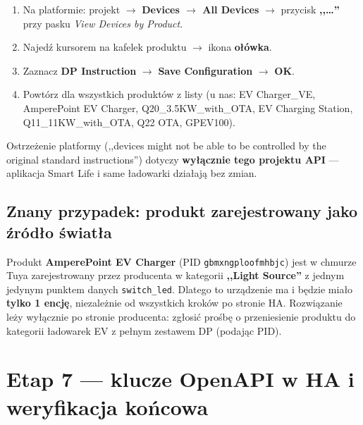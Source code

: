 \documentclass[11pt,a4paper]{article}
\begin{document}
\begin{enumerate}
\item Na platformie: projekt $\to$ \textbf{Devices $\to$ All Devices} $\to$ przycisk \textbf{,,\ldots''} przy pasku \emph{View Devices by Product}.
\item Najedź kursorem na kafelek produktu $\to$ ikona \textbf{ołówka}.
\item Zaznacz \textbf{DP Instruction} $\to$ \textbf{Save Configuration} $\to$ \textbf{OK}.
\item Powtórz dla wszystkich produktów z listy (u nas: EV Charger\_VE, AmperePoint EV Charger, Q20\_3.5KW\_with\_OTA, EV Charging Station, Q11\_11KW\_with\_OTA, Q22 OTA, GPEV100).
\end{enumerate}

Ostrzeżenie platformy (,,devices might not be able to be controlled by the original standard instructions'') dotyczy \textbf{wyłącznie tego projektu API} --- aplikacja Smart Life i same ładowarki działają bez zmian.

\subsection{Znany przypadek: produkt zarejestrowany jako źródło światła}
\label{sec:lightsource}

Produkt \textbf{AmperePoint EV Charger} (PID \texttt{gbmxngploofmhbjc}) jest w chmurze Tuya zarejestrowany przez producenta w kategorii \textbf{,,Light Source''} z jednym jedynym punktem danych \texttt{switch\_led}. Dlatego to urządzenie ma i będzie miało \textbf{tylko 1 encję}, niezależnie od wszystkich kroków po stronie HA. Rozwiązanie leży wyłącznie po stronie producenta: zgłosić prośbę o przeniesienie produktu do kategorii ładowarek EV z pełnym zestawem DP (podając PID).

\section{Etap 7 --- klucze OpenAPI w HA i weryfikacja końcowa}
\label{sec:etap7}
\end{document}
